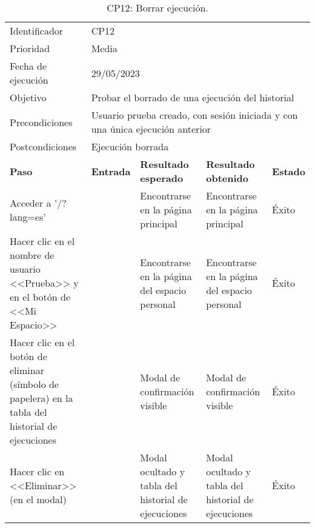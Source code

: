     \begin{center}
    \begin{table}[H]
    \begin{tabular}{p{}p{}p{}p{}p{}}
    \rowcolor{gray!25}
    Identificador   & \multicolumn{4}{l}{CP12}                                                   \\
    Prioridad   & \multicolumn{4}{l}{Media}                                                    \\
    \rowcolor{gray!25}
    Fecha de ejecución   & \multicolumn{4}{l}{29/05/2023}                                                    \\
    Objetivo        & \multicolumn{4}{p{0.80\textwidth}}{Probar el borrado de una ejecución del historial}                                                     \\
    \rowcolor{gray!25}
    Precondiciones  & \multicolumn{4}{p{0.80\textwidth}}{Usuario prueba creado, con sesión iniciada y con una única ejecución anterior}                                                     \\
    Postcondiciones & \multicolumn{4}{l}{Ejecución borrada}                                                     \\ \hline
    \rowcolor{gray!25}
    \textbf{Paso}   & \textbf{Entrada} & \textbf{Resultado esperado} & \textbf{Resultado obtenido} & \textbf{Estado} \\ \hline
    Acceder a '/?lang=es'                                 &                        & Encontrarse en la página principal                                   & Encontrarse en la página principal                           & Éxito  \\ \hline
    Hacer clic en el nombre de usuario <<Prueba>> y en el botón de <<Mi Espacio>>  &     & Encontrarse en la página del espacio personal                  & Encontrarse en la página del espacio personal                       & Éxito  \\ \hline 
    Hacer clic en el botón de eliminar (símbolo de papelera) en la tabla del historial de ejecuciones &                     & Modal de confirmación visible                                     & Modal de confirmación visible                     & Éxito                            \\ \hline
    Hacer clic en <<Eliminar>> (en el modal)              &                        & Modal ocultado y tabla del historial de ejecuciones                    & Modal ocultado y tabla del historial de ejecuciones            & Éxito                            \\ \hline
    \end{tabular}
    \caption{CP12: Borrar ejecución.}
    \end{table}
    \end{center}